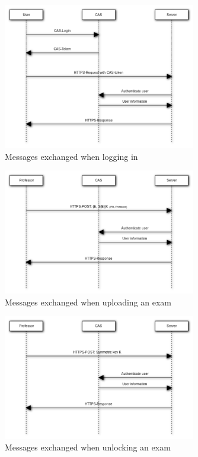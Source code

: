 \documentclass{article}
\begin{document}
\begin{figure}
\begin{center}
\includegraphics[width=0.75\textwidth]{images/login.pdf}
\caption{Messages exchanged when logging in}
\label{fig:login}
\end{center}
\end{figure}

\begin{figure}
\begin{center}
\includegraphics[width=0.75\textwidth]{images/upload_exam.pdf}
\caption{Messages exchanged when uploading an exam}
\label{fig:upload)exam}
\end{center}
\end{figure}

\begin{figure}
\begin{center}
\includegraphics[width=0.75\textwidth]{images/unlock_exam.pdf}
\caption{Messages exchanged when unlocking an exam}
\label{fig:unlock-exam}
\end{center}
\end{figure}
\end{document}
